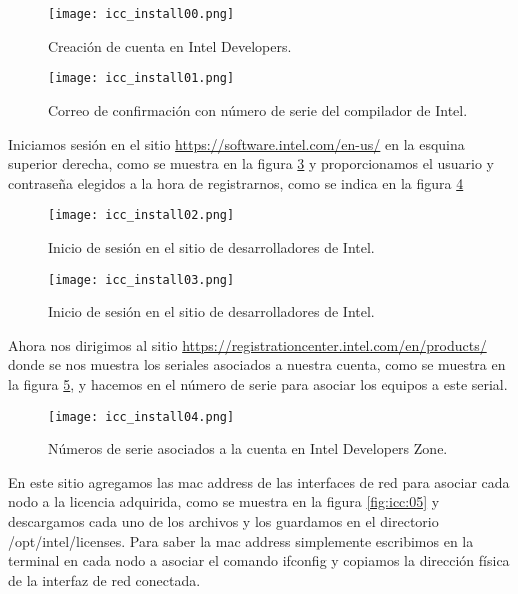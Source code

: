 \begin{figure}[H]
\centering
\texttt{[image: icc\_install00.png]}
\caption{Creación de cuenta en Intel Developers.}
\label{fig:icc:00}
\end{figure}


\begin{figure}[H]
\centering
\texttt{[image: icc\_install01.png]}
\caption{Correo de confirmación con número de serie del compilador de Intel.}
\label{fig:icc:01}
\end{figure}

Iniciamos sesión en el sitio \url{https://software.intel.com/en-us/} en la esquina superior derecha, como se muestra en la figura \ref{fig:icc:02} y proporcionamos el usuario y contraseña elegidos a la hora de registrarnos, como se indica en la figura \ref{fig:icc:03}

\begin{figure}[H]
\centering
\texttt{[image: icc\_install02.png]}
\caption{Inicio de sesión en el sitio de desarrolladores de Intel.}
\label{fig:icc:02}
\end{figure}


\begin{figure}[H]
\centering
\texttt{[image: icc\_install03.png]}
\caption{Inicio de sesión en el sitio de desarrolladores de Intel.}
\label{fig:icc:03}
\end{figure}

Ahora nos dirigimos al sitio \url{https://registrationcenter.intel.com/en/products/} donde se nos muestra los seriales asociados a nuestra cuenta, como se muestra en la figura \ref{fig:icc:04}, y hacemos en el número de serie para asociar los equipos a este serial.

\begin{figure}[H]
\centering
\texttt{[image: icc\_install04.png]}
\caption{Números de serie asociados a la cuenta en Intel Developers Zone.}
\label{fig:icc:04}
\end{figure}

En este sitio agregamos las mac address de las interfaces de red para asociar cada nodo a la licencia adquirida, como se muestra en la figura \ref{fig:icc:05} y descargamos cada uno de los archivos y los guardamos en el directorio /opt/intel/licenses. Para saber la mac address simplemente escribimos en la terminal en cada nodo a asociar el comando ifconfig y copiamos la dirección física de la interfaz de red conectada.

